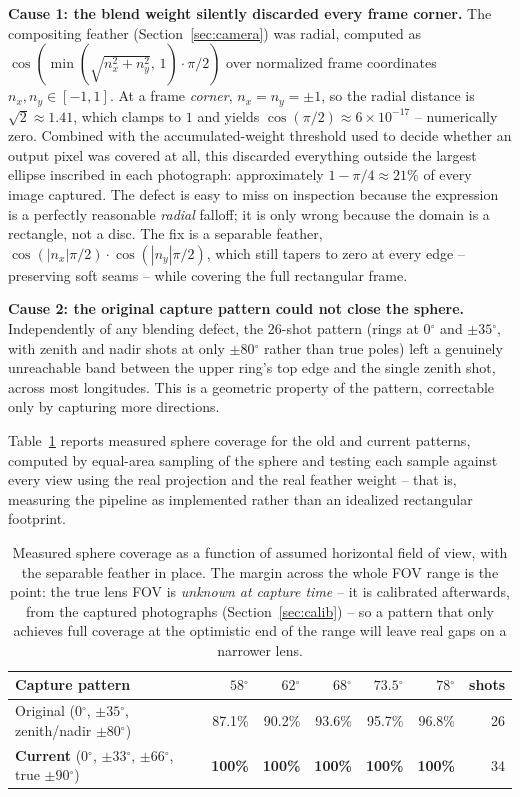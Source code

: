 \documentclass[11pt]{article}
\newcommand{\Deg}{\ensuremath{^{\circ}}}
\begin{document}
\textbf{Cause 1: the blend weight silently discarded every frame corner.} The compositing feather (Section~\ref{sec:camera}) was radial, computed as $\cos\!\left(\min\!\left(\sqrt{n_x^2+n_y^2},\,1\right)\cdot\pi/2\right)$ over normalized frame coordinates $n_x, n_y \in [-1,1]$. At a frame \emph{corner}, $n_x = n_y = \pm 1$, so the radial distance is $\sqrt{2}\approx1.41$, which clamps to $1$ and yields $\cos(\pi/2)\approx 6\times10^{-17}$ -- numerically zero. Combined with the accumulated-weight threshold used to decide whether an output pixel was covered at all, this discarded everything outside the largest ellipse inscribed in each photograph: approximately $1-\pi/4 \approx 21\%$ of every image captured. The defect is easy to miss on inspection because the expression is a perfectly reasonable \emph{radial} falloff; it is only wrong because the domain is a rectangle, not a disc. The fix is a separable feather, $\cos(|n_x|\pi/2)\cdot\cos(|n_y|\pi/2)$, which still tapers to zero at every edge -- preserving soft seams -- while covering the full rectangular frame.

\textbf{Cause 2: the original capture pattern could not close the sphere.} Independently of any blending defect, the 26-shot pattern (rings at $0\Deg$ and $\pm35\Deg$, with zenith and nadir shots at only $\pm80\Deg$ rather than true poles) left a genuinely unreachable band between the upper ring's top edge and the single zenith shot, across most longitudes. This is a geometric property of the pattern, correctable only by capturing more directions.

Table~\ref{tab:coverage} reports measured sphere coverage for the old and current patterns, computed by equal-area sampling of the sphere and testing each sample against every view using the real projection and the real feather weight -- that is, measuring the pipeline as implemented rather than an idealized rectangular footprint.

\begin{table}[h]
\centering
\small
\begin{tabular}{@{}lrrrrrr@{}}
\toprule
\textbf{Capture pattern} & $58\Deg$ & $62\Deg$ & $68\Deg$ & $73.5\Deg$ & $78\Deg$ & \textbf{shots} \\
\midrule
Original ($0\Deg$, $\pm35\Deg$, zenith/nadir $\pm80\Deg$) & 87.1\% & 90.2\% & 93.6\% & 95.7\% & 96.8\% & 26 \\
\textbf{Current} ($0\Deg$, $\pm33\Deg$, $\pm66\Deg$, true $\pm90\Deg$) & \textbf{100\%} & \textbf{100\%} & \textbf{100\%} & \textbf{100\%} & \textbf{100\%} & 34 \\
\bottomrule
\end{tabular}
\caption{Measured sphere coverage as a function of assumed horizontal field of view, with the separable feather in place. The margin across the whole FOV range is the point: the true lens FOV is \emph{unknown at capture time} -- it is calibrated afterwards, from the captured photographs (Section~\ref{sec:calib}) -- so a pattern that only achieves full coverage at the optimistic end of the range will leave real gaps on a narrower lens.}
\label{tab:coverage}
\end{table}
\end{document}
